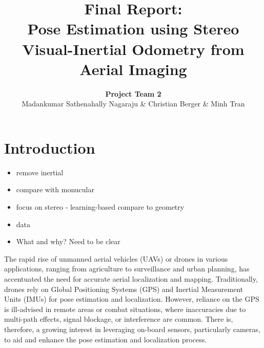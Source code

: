 \documentclass[10pt,letterpaper]{article}
\title{
\Large{\textbf{Final Report: \\
Pose Estimation using Stereo Visual-Inertial Odometry from Aerial Imaging}}
}
\date{}
\author{
  \textbf{Project Team 2} \\
  Madankumar Sathenahally Nagaraju & Christian Berger & Minh Tran \\
}
\begin{document}
\maketitle
\thispagestyle{empty}

\section{Introduction}
\begin{itemize}
    \item remove inertial
    \item compare with monucular
    \item focus on stereo - learning-based compare to geometry
    \item data
    \item What and why? Need to be clear
\end{itemize}

The rapid rise of unmanned aerial vehicles (UAVs) or drones in various applications, ranging from agriculture to surveillance and urban planning, has accentuated the need for accurate aerial localization and mapping. Traditionally, drones rely on Global Positioning Systems (GPS) and Inertial Measurement Units (IMUs) for pose estimation and localization. However, reliance on the GPS is ill-advised in remote areas or combat situations, where inaccuracies due to multi-path effects, signal blockage, or interference are common. There is, therefore, a growing interest in leveraging on-board sensors, particularly cameras, to aid and enhance the pose estimation and localization process.

\end{document}
